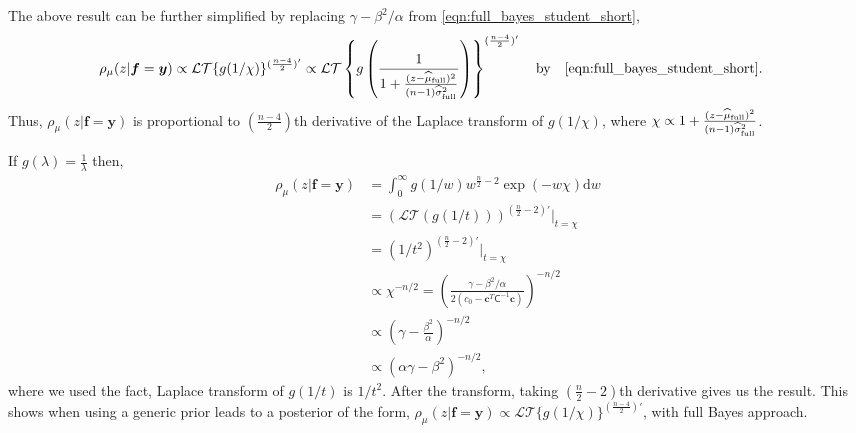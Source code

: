 \documentclass{iitthesis}          %
\newcommand{\bm}[1]{\boldsymbol{#1}}
\newcommand{\D}[1]{\text{d}{#1}}
\newcommand{\vc}{\bm{c}}
\newcommand{\vf}{\bm{f}}
\newcommand{\vy}{\bm{y}}
\newcommand{\mC}{\mathsf{C}}
\newcommand{\hmu}{\widehat{\mu}}
\begin{document}
The above result can be further simplified by replacing $\gamma - \beta^2/\alpha$ from  \eqref{eqn:full_bayes_student_short},
\begin{align*}
{\rho_{\mu}(z | \vf = \vy)} \propto \mathcal{LT} \{ g(1/\chi) \}^{(\frac{n-4}2)'} 
& \propto
\mathcal{LT} \left\{ g 
\left(
\frac{1} 
{ 1 +  \frac{(z - \hmu_{\textup{full}})^2}{(n-1)\widehat{\sigma}_{\textup{full}}^2} }
\right) \right\}^{(\frac{n-4}2)'} \quad \text{by} \quad \eqref{eqn:full_bayes_student_short}.
\end{align*}
Thus, $\rho_{\mu}(z | \vf = \vy)$  is proportional to $(\frac{n-4}{2})$th derivative of the Laplace transform of $g(1/\chi)$, where $\chi \propto { 1 +  \frac{(z - \hmu_{\textup{full}})^2}{(n-1)\widehat{\sigma}_{\textup{full}}^2} } $.


If $\displaystyle g(\lambda) = \frac{1}{\lambda}$ then, 
\begin{align*}
{\rho_{\mu}(z | \vf = \vy)} 
&= \int_{0}^\infty g(1/w)  w^{\frac n2 -2}
\exp \left(  - w \chi \right)
\D w
\\
& = \displaystyle \left(\mathcal{LT}(g(1/t)) \right)^{(\frac n2 -2)'} \lvert_{t=\chi}
\\
& = \left(1/t^{2} \right)^{(\frac n2 -2)'} \lvert_{t=\chi}
\\
& \propto \chi^{-n/2} = \left( \frac{  \gamma - \beta^2/\alpha}{2(c_0  -\vc ^T \mC^{-1} \vc)} \right)^{-n/2}
\\
& \propto \left(\gamma - \frac{\beta^2}{\alpha}\right)^{-n/2}
\\
& \propto \left(\alpha \gamma - \beta^2\right)^{-n/2},
\end{align*}
where we used the fact, Laplace transform of $g(1/t)$ is $1/t^2$. After the transform, taking $(\frac n2 -2)$th derivative gives us the result. This shows when using a generic prior leads to a posterior of the form,
$ {\rho_{\mu}(z | \vf = \vy)}  \propto  \mathcal{LT} \{ g(1/\chi) \}^{(\frac{n-4}2)'} $, with full Bayes approach.
\end{document}
